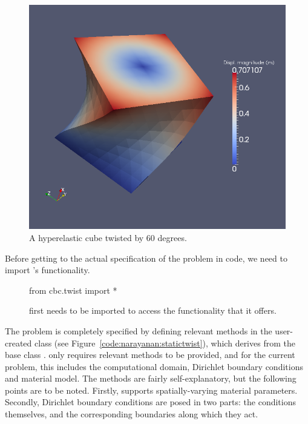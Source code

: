 \begin{figure}
  \begin{center}
    \includegraphics{chapters/narayanan/images/png/twistedcube.png}
  \end{center}
  \caption{A hyperelastic cube twisted by 60 degrees.}
    \label{fig:narayanan:twistedcube}
\end{figure}

Before getting to the actual specification of the problem in code, we
need to import \twist's functionality.
\begin{figure}
\begin{python}
from cbc.twist import *
\end{python}
\caption{\twist{} first needs to be imported to access the
  functionality that it offers.}
\end{figure}
The problem is completely specified by defining
relevant methods in the user-created class  (see
Figure~\ref{code:narayanan:statictwist}), which derives from the base
class . \twist{} only requires relevant
methods to be provided, and for the current problem, this includes
the computational domain, Dirichlet boundary conditions and material
model. The methods are fairly self-explanatory, but the following points
are to be noted. Firstly, \twist{} supports spatially-varying material
parameters. Secondly, Dirichlet boundary conditions are posed in two
parts: the conditions themselves, and the corresponding boundaries along
which they act.

